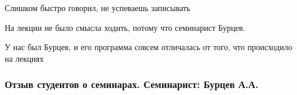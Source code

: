             \begin{commentbox} 
                Слишком быстро говорил, не успеваешь записывать 
            \end{commentbox} 
        
            \begin{commentbox} 
                На лекции не было смысла ходить, потому что семинарист Бурцев. 
            \end{commentbox} 
        
            \begin{commentbox} 
                У нас был Бурцев, и его программа совсем отличалась от того, что происходило на лекциях 
            \end{commentbox} 
    
    
    \subsubsection{Отзыв студентов о семинарах. Семинарист: Бурцев А.А.}
